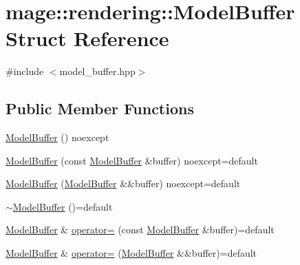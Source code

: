 \hypertarget{structmage_1_1rendering_1_1_model_buffer}{}\section{mage\+:\+:rendering\+:\+:Model\+Buffer Struct Reference}
\label{structmage_1_1rendering_1_1_model_buffer}


{\ttfamily \#include $<$model\+\_\+buffer.\+hpp$>$}

\subsection*{Public Member Functions}
\begin{DoxyCompactItemize}
\item 
\mbox{\hyperlink{structmage_1_1rendering_1_1_model_buffer_a31cc9c498bbb467b45d7a440e744ece4}{Model\+Buffer}} () noexcept
\item 
\mbox{\hyperlink{structmage_1_1rendering_1_1_model_buffer_a2a70d56be64cc621e61e056fb08d6905}{Model\+Buffer}} (const \mbox{\hyperlink{structmage_1_1rendering_1_1_model_buffer}{Model\+Buffer}} \&buffer) noexcept=default
\item 
\mbox{\hyperlink{structmage_1_1rendering_1_1_model_buffer_aa562199c2433c47baabaf32743b1a124}{Model\+Buffer}} (\mbox{\hyperlink{structmage_1_1rendering_1_1_model_buffer}{Model\+Buffer}} \&\&buffer) noexcept=default
\item 
\mbox{\hyperlink{structmage_1_1rendering_1_1_model_buffer_a8234e3377ffe079b8ac045198d8cdbc1}{$\sim$\+Model\+Buffer}} ()=default
\item 
\mbox{\hyperlink{structmage_1_1rendering_1_1_model_buffer}{Model\+Buffer}} \& \mbox{\hyperlink{structmage_1_1rendering_1_1_model_buffer_a7435706a5297e1dfac59ac3c24a8e168}{operator=}} (const \mbox{\hyperlink{structmage_1_1rendering_1_1_model_buffer}{Model\+Buffer}} \&buffer)=default
\item 
\mbox{\hyperlink{structmage_1_1rendering_1_1_model_buffer}{Model\+Buffer}} \& \mbox{\hyperlink{structmage_1_1rendering_1_1_model_buffer_a083377a5af4c7b14c2db8659824789ff}{operator=}} (\mbox{\hyperlink{structmage_1_1rendering_1_1_model_buffer}{Model\+Buffer}} \&\&buffer)=default
\end{DoxyCompactItemize}
